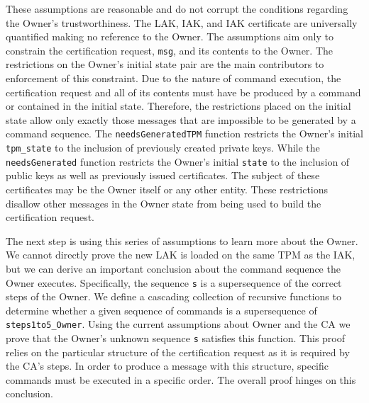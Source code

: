 \documentclass[runningheads]{llncs}
\begin{document}
These assumptions are reasonable and do not corrupt the conditions
regarding the Owner's trustworthiness. The LAK, IAK, and IAK
certificate are universally quantified making no reference to the
Owner. The assumptions aim only to constrain the certification
request, \verb|msg|, and its contents to the Owner.  The restrictions
on the Owner's initial state pair are the main contributors to
enforcement of this constraint. Due to the nature of command
execution, the certification request and all of its contents must have
be produced by a command or contained in the initial state.
Therefore, the restrictions placed on the initial state allow only
exactly those messages that are impossible to be generated by a
command sequence.  The \verb|needsGeneratedTPM| function restricts the
Owner's initial \verb|tpm_state| to the inclusion of previously
created private keys. While the \verb|needsGenerated| function
restricts the Owner's initial \verb|state| to the inclusion of public
keys as well as previously issued certificates.  The subject of these
certificates may be the Owner itself or any other entity.  These
restrictions disallow other messages in the Owner state from being
used to build the certification request.

The next step is using this series of assumptions to learn more about
the Owner. We cannot directly prove the new LAK is loaded on the same
TPM as the IAK, but we can derive an important conclusion about the
command sequence the Owner executes. Specifically, the sequence
\verb|s| is a supersequence of the correct steps of the Owner.  We
define a cascading collection of recursive functions to determine
whether a given sequence of commands is a supersequence of
\verb|steps1to5_Owner|.  Using the current assumptions about Owner and
the CA we prove that the Owner's unknown sequence \verb|s| satisfies
this function. This proof relies on the particular structure of the
certification request as it is required by the CA's steps. In order to
produce a message with this structure, specific commands must be
executed in a specific order.  The overall proof hinges on this
conclusion.
\end{document}

